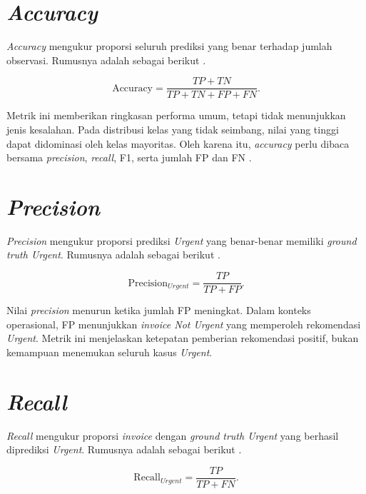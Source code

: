 \FloatBarrier

\section{\textit{Accuracy}}

\textit{Accuracy} mengukur proporsi seluruh prediksi yang benar terhadap jumlah observasi. Rumusnya adalah sebagai berikut \cite{SokolovaLapalme2009,RainioEtAl2024}.

\begin{equation}
\mathrm{Accuracy}=\frac{TP+TN}{TP+TN+FP+FN}.
\label{eq:accuracy-bab-dua}
\end{equation}

Metrik ini memberikan ringkasan performa umum, tetapi tidak menunjukkan jenis kesalahan. Pada distribusi kelas yang tidak seimbang, nilai yang tinggi dapat didominasi oleh kelas mayoritas. Oleh karena itu, \textit{accuracy} perlu dibaca bersama \textit{precision}, \textit{recall}, F1, serta jumlah FP dan FN \cite{RainioEtAl2024}.

\section{\textit{Precision}}

\textit{Precision} mengukur proporsi prediksi \textit{Urgent} yang benar-benar memiliki \textit{ground truth Urgent}. Rumusnya adalah sebagai berikut \cite{SokolovaLapalme2009,RainioEtAl2024}.

\begin{equation}
\mathrm{Precision}_{Urgent}=\frac{TP}{TP+FP}.
\label{eq:precision-bab-dua}
\end{equation}

Nilai \textit{precision} menurun ketika jumlah FP meningkat. Dalam konteks operasional, FP menunjukkan \textit{invoice Not Urgent} yang memperoleh rekomendasi \textit{Urgent}. Metrik ini menjelaskan ketepatan pemberian rekomendasi positif, bukan kemampuan menemukan seluruh kasus \textit{Urgent}.

\section{\textit{Recall}}

\textit{Recall} mengukur proporsi \textit{invoice} dengan \textit{ground truth Urgent} yang berhasil diprediksi \textit{Urgent}. Rumusnya adalah sebagai berikut \cite{SokolovaLapalme2009,RainioEtAl2024}.

\begin{equation}
\mathrm{Recall}_{Urgent}=\frac{TP}{TP+FN}.
\label{eq:recall-bab-dua}
\end{equation}

